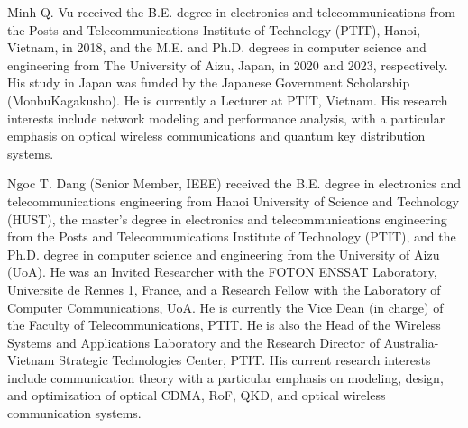 \documentclass[journal,10pt]{IEEEtran}
\begin{document}
\begin{IEEEbiographynophoto}{Minh Q. Vu}
received the B.E. degree in electronics and telecommunications from the Posts and Telecommunications Institute of Technology (PTIT), Hanoi, Vietnam, in 2018, and the M.E. and Ph.D. degrees in computer science and engineering from The University of Aizu, Japan, in 2020 and 2023, respectively. His study in Japan was funded by the Japanese Government Scholarship (MonbuKagakusho). He is currently a Lecturer at PTIT, Vietnam. His research interests include network modeling and performance analysis, with a particular emphasis on optical wireless communications and quantum key distribution systems.
\end{IEEEbiographynophoto}

\begin{IEEEbiographynophoto}{Ngoc T. Dang}
(Senior Member, IEEE) received the B.E. degree in electronics and telecommunications engineering from Hanoi University of Science and Technology (HUST), the master's degree in electronics and telecommunications engineering from the Posts and Telecommunications Institute of Technology (PTIT), and the Ph.D. degree in computer science and engineering from the University of Aizu (UoA). He was an Invited Researcher with the FOTON ENSSAT Laboratory, Universite de Rennes 1, France, and a Research Fellow with the Laboratory of Computer Communications, UoA. He is currently the Vice Dean (in charge) of the Faculty of Telecommunications, PTIT. He is also the Head of the Wireless Systems and Applications Laboratory and the Research Director of Australia-Vietnam Strategic Technologies Center, PTIT. His current research interests include communication theory with a particular emphasis on modeling, design, and optimization of optical CDMA, RoF, QKD, and optical wireless communication systems.
\end{IEEEbiographynophoto}
\end{document}
